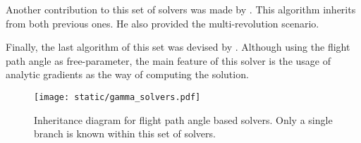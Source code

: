 Another contribution to this set of solvers was made by \cite{arlulkar2011}.
This algorithm inherits from both previous ones. He also provided the
multi-revolution scenario.

Finally, the last algorithm of this set was devised by \cite{ahn2013}. Although
using the flight path angle as free-parameter, the main feature of this solver
is the usage of analytic gradients as the way of computing the solution.

\vspace{0.5cm}
\begin{figure}[h]
  \centering
  \texttt{[image: static/gamma\_solvers.pdf]}
  \caption[Flight path based solvers]{Inheritance diagram for flight path angle based solvers. Only a
    single branch is known within this set of solvers.}
  \label{fig:regularizing_solvers}
\end{figure}


